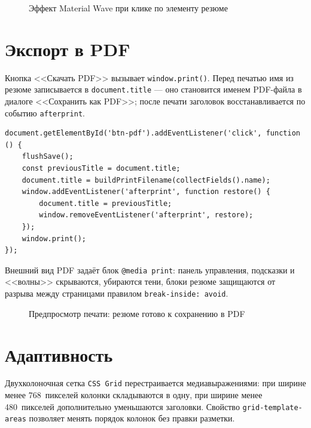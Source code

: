 \begin{figure}[h]
  \centering
  \caption{Эффект Material Wave при клике по элементу резюме}
  \label{fig:ripple}
\end{figure}

\section{Экспорт в PDF}

Кнопка <<Скачать PDF>> вызывает \texttt{window.print()}. Перед печатью имя
из резюме записывается в \texttt{document.title} --- оно становится именем
PDF-файла в диалоге <<Сохранить как PDF>>; после печати заголовок
восстанавливается по событию \texttt{afterprint}.

\begin{lstlisting}[caption={Запуск печати (\texttt{start.js})},captionpos=b]
document.getElementById('btn-pdf').addEventListener('click', function () {
    flushSave();
    const previousTitle = document.title;
    document.title = buildPrintFilename(collectFields().name);
    window.addEventListener('afterprint', function restore() {
        document.title = previousTitle;
        window.removeEventListener('afterprint', restore);
    });
    window.print();
});
\end{lstlisting}

Внешний вид PDF задаёт блок \texttt{@media print}: панель управления,
подсказки и <<волны>> скрываются, убираются тени, блоки резюме защищаются от
разрыва между страницами правилом \texttt{break-inside:~avoid}.

\begin{figure}[h]
  \centering
  \caption{Предпросмотр печати: резюме готово к сохранению в PDF}
  \label{fig:print}
\end{figure}

\section{Адаптивность}

Двухколоночная сетка \texttt{CSS~Grid} перестраивается медиавыражениями: при
ширине менее 768~пикселей колонки складываются в одну, при ширине менее
480~пикселей дополнительно уменьшаются заголовки. Свойство
\texttt{grid-template-areas} позволяет менять порядок колонок без правки
разметки.

